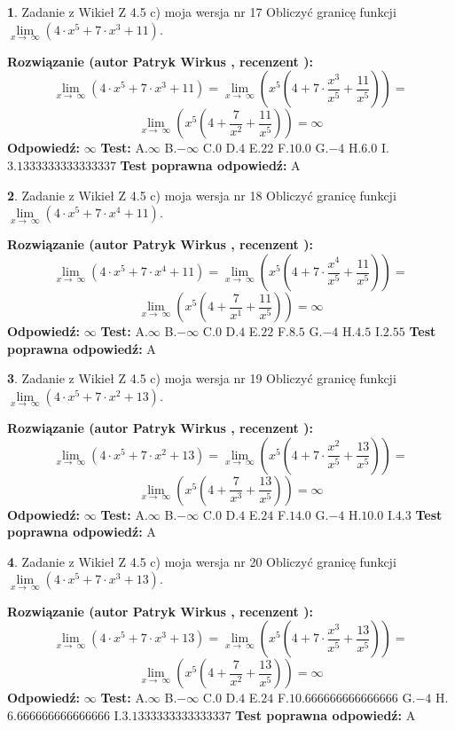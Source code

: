 \documentclass[12pt, a4paper]{article}
\theoremstyle{definition} %
\newtheorem{zad}{}
\newcommand{\zadStart}[1]{\begin{zad}#1\newline}
\newcommand{\zadStop}{\end{zad}}
\newcommand{\rozwStart}[2]{\noindent \textbf{Rozwiązanie (autor #1 , recenzent #2): }\newline}
\newcommand{\rozwStop}{\newline}
\newcommand{\odpStart}{\noindent \textbf{Odpowiedź:}\newline}
\newcommand{\odpStop}{\newline}
\newcommand{\testStart}{\noindent \textbf{Test:}\newline}
\newcommand{\testStop}{\newline}
\newcommand{\kluczStart}{\noindent \textbf{Test poprawna odpowiedź:}\newline}
\newcommand{\kluczStop}{\newline}
\begin{document}
\zadStart{Zadanie z Wikieł Z 4.5 c) moja wersja nr 17}
Obliczyć granicę funkcji  $\lim\limits_{x\to\ \infty}(4 \cdot x^{5}+7 \cdot x^{3}+11)$.
\zadStop
\rozwStart{Patryk Wirkus}{}
$$\lim\limits_{x\to\ \infty}(4 \cdot x^{5}+7 \cdot x^{3}+11) = \lim\limits_{x\to\ \infty}(x^{5}(4 +7 \cdot \frac{x^{3}}{x^{5}}+\frac{11}{x^{5}})) =$$ $$\lim\limits_{x\to\ \infty}(x^{5}(4 +\frac{7}{x^{2}}+\frac{11}{x^{5}})) =\infty$$
\rozwStop
\odpStart
$\infty$
\odpStop
\testStart
A.$\infty$ B.$-\infty$ C.$0$ D.$4$ E.$22$
F.$10.0$ G.$-4$
H.$6.0$
I.$3.1333333333333337$
\testStop
\kluczStart
A
\kluczStop



\zadStart{Zadanie z Wikieł Z 4.5 c) moja wersja nr 18}
Obliczyć granicę funkcji  $\lim\limits_{x\to\ \infty}(4 \cdot x^{5}+7 \cdot x^{4}+11)$.
\zadStop
\rozwStart{Patryk Wirkus}{}
$$\lim\limits_{x\to\ \infty}(4 \cdot x^{5}+7 \cdot x^{4}+11) = \lim\limits_{x\to\ \infty}(x^{5}(4 +7 \cdot \frac{x^{4}}{x^{5}}+\frac{11}{x^{5}})) =$$ $$\lim\limits_{x\to\ \infty}(x^{5}(4 +\frac{7}{x^{1}}+\frac{11}{x^{5}})) =\infty$$
\rozwStop
\odpStart
$\infty$
\odpStop
\testStart
A.$\infty$ B.$-\infty$ C.$0$ D.$4$ E.$22$
F.$8.5$ G.$-4$
H.$4.5$
I.$2.55$
\testStop
\kluczStart
A
\kluczStop



\zadStart{Zadanie z Wikieł Z 4.5 c) moja wersja nr 19}
Obliczyć granicę funkcji  $\lim\limits_{x\to\ \infty}(4 \cdot x^{5}+7 \cdot x^{2}+13)$.
\zadStop
\rozwStart{Patryk Wirkus}{}
$$\lim\limits_{x\to\ \infty}(4 \cdot x^{5}+7 \cdot x^{2}+13) = \lim\limits_{x\to\ \infty}(x^{5}(4 +7 \cdot \frac{x^{2}}{x^{5}}+\frac{13}{x^{5}})) =$$ $$\lim\limits_{x\to\ \infty}(x^{5}(4 +\frac{7}{x^{3}}+\frac{13}{x^{5}})) =\infty$$
\rozwStop
\odpStart
$\infty$
\odpStop
\testStart
A.$\infty$ B.$-\infty$ C.$0$ D.$4$ E.$24$
F.$14.0$ G.$-4$
H.$10.0$
I.$4.3$
\testStop
\kluczStart
A
\kluczStop



\zadStart{Zadanie z Wikieł Z 4.5 c) moja wersja nr 20}
Obliczyć granicę funkcji  $\lim\limits_{x\to\ \infty}(4 \cdot x^{5}+7 \cdot x^{3}+13)$.
\zadStop
\rozwStart{Patryk Wirkus}{}
$$\lim\limits_{x\to\ \infty}(4 \cdot x^{5}+7 \cdot x^{3}+13) = \lim\limits_{x\to\ \infty}(x^{5}(4 +7 \cdot \frac{x^{3}}{x^{5}}+\frac{13}{x^{5}})) =$$ $$\lim\limits_{x\to\ \infty}(x^{5}(4 +\frac{7}{x^{2}}+\frac{13}{x^{5}})) =\infty$$
\rozwStop
\odpStart
$\infty$
\odpStop
\testStart
A.$\infty$ B.$-\infty$ C.$0$ D.$4$ E.$24$
F.$10.666666666666666$ G.$-4$
H.$6.666666666666666$
I.$3.1333333333333337$
\testStop
\kluczStart
A
\kluczStop
\end{document}

